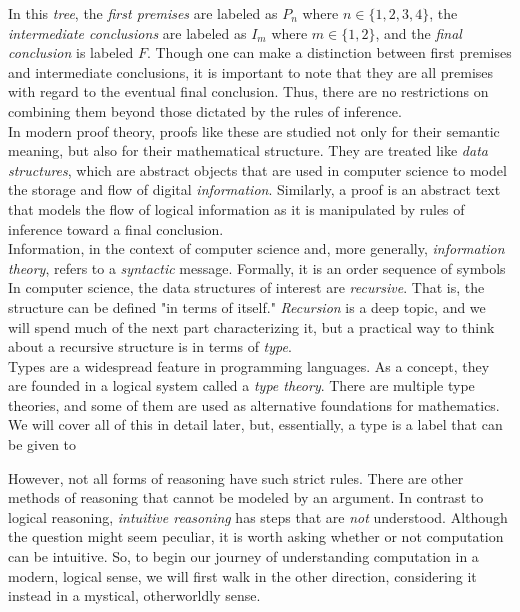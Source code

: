 In this \textit{tree}, the \textit{first premises} are labeled as $P_n$ where $n\in\{1,2,3,4\}$, the \textit{intermediate conclusions} are labeled as $I_m$ where $m\in\{1,2\}$, and the \textit{final conclusion} is labeled $F$. Though one can make a distinction between first premises and intermediate conclusions, it is important to note that they are all premises with regard to the eventual final conclusion. Thus, there are no restrictions on combining them beyond those dictated by the rules of inference. \\

In modern proof theory, proofs like these are studied not only for their semantic meaning, but also for their mathematical structure. They are treated like \textit{data structures}, which are abstract objects that are used in computer science to model the storage and flow of digital \textit{information}. Similarly, a proof is an abstract text that models the flow of logical information as it is manipulated by rules of inference toward a final conclusion. \\

Information, in the context of computer science and, more generally, \textit{information theory}, refers to a \textit{syntactic} message. Formally, it is an order sequence of symbols \\


In computer science, the data structures of interest are \textit{recursive}. That is, the structure can be defined "in terms of itself." \textit{Recursion} is a deep topic, and we will spend much of the next part characterizing it, but a practical way to think about a recursive structure is in terms of \textit{type}. \\

Types are a widespread feature in programming languages. As a concept, they are founded in a logical system called a \textit{type theory}. There are multiple type theories, and some of them are used as alternative foundations for mathematics. We will cover all of this in detail later, but, essentially, a type is a label that can be given to 


However, not all forms of reasoning have such strict rules. There are other methods of reasoning that cannot be modeled by an argument. In contrast to logical reasoning, \textit{intuitive reasoning} has steps that are \textit{not} understood. Although the question might seem peculiar, it is worth asking whether or not computation can be intuitive. So, to begin our journey of understanding computation in a modern, logical sense, we will first walk in the other direction, considering it instead in a mystical, otherworldly sense. \\

